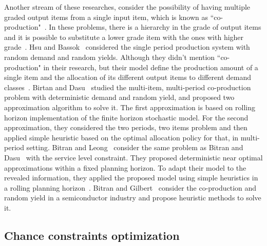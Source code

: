 \documentclass[10pt]{article}
\begin{document}
Another stream of these researches, consider the possibility of having multiple graded output items from a single input item, which is known as ``co-production"~\cite{ng2012robust}. In these problems, there is a hierarchy in the grade of output items and it is possible to substitute a lower grade item with the ones with higher grade~\cite{bitran1992ordering}. Hsu and Bassok~\cite{hsu1999random} considered the single period production system with random demand  and random yields. Although they didn't mention ``co-production" in their research, but their model define the production amount of a single item and the allocation of its different output items to different demand classes~\cite{hsu1999random}.
Birtan and Dasu~\cite{bitran1992ordering} studied the multi-item, multi-period co-production problem with deterministic demand and random yield, and proposed two approximation algorithm to solve it. The first approximation is based on rolling horizon implementation of the finite horizon stochastic model. For the second approximation, they considered the two periods, two items problem and then applied simple heuristic based on the optimal allocation policy for that, in multi-period setting. Bitran and Leong~\cite{bitran1992deterministic} consider the same problem as Bitran and Dasu~\cite{bitran1992ordering} with the service level constraint. They proposed deterministic near optimal approximations within a fixed planning horizon. To adapt their model to the revealed information, they applied the proposed model using simple heuristics in a rolling planning horizon~\cite{bitran1992deterministic}.  Bitran and Gilbert~\cite{bitran1994co} consider the co-production and random yield in a semiconductor industry and propose heuristic methods to solve it. 
 
\subsection{Chance constraints optimization}
\end{document}
